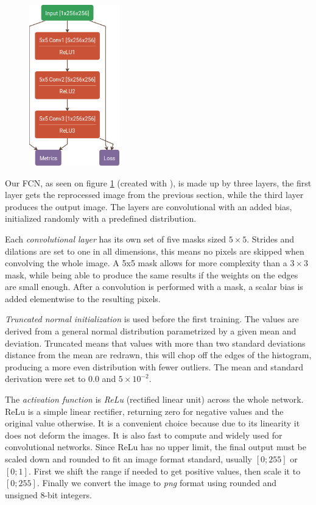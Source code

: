 \documentclass[12pt]{report}
\begin{document}
\begin{figure}
	\includegraphics[width=0.35\textwidth]{images/net.png}
	\caption{ }
	\label{net}
\end{figure}
Our FCN, as seen on figure \ref{net} (created with \cite{netscope}), is made up by three layers, the first layer gets the reprocessed image from the previous section, while the third layer produces the output image. The layers are convolutional with an added bias, initialized randomly with a predefined distribution.

Each \textit{convolutional layer} has its own set of five masks sized $5\times5$. Strides and dilations are set to one in all dimensions, this means no pixels are skipped when convolving the whole image. A 5x5 mask allows for more complexity than a $3\times3$ mask, while being able to produce the same results if the weights on the edges are small enough. After a convolution is performed with a mask, a scalar bias is added elementwise to the resulting pixels.

\textit{Truncated normal initialization} \cite{trunc} is used before the first training. The values are derived from a general normal distribution parametrized by a given mean and deviation. Truncated means that values with more than two standard deviations distance from the mean are redrawn, this will chop off the edges of the histogram, producing a more even distribution with fewer outliers. The mean and standard derivation were set to $0.0$ and $ 5\times10^{-2} $.

The \textit{activation function} is \textit{ReLu} (rectified linear unit) \cite{relu} across the whole network. ReLu is a simple linear rectifier, returning zero for negative values and the original value otherwise. It is a convenient choice because due to its linearity it does not deform the images. It is also fast to compute and widely used for convolutional networks. Since ReLu has no upper limit, the final output must be scaled down and rounded to fit an image format standard, usually $ \left[0;255\right] $ or $ \left[0;1\right] $. First we shift the range if needed to get positive values, then scale it to $ \left[0;255\right] $. Finally we convert the image to \textit{png} format using rounded and unsigned 8-bit integers.
\end{document}

